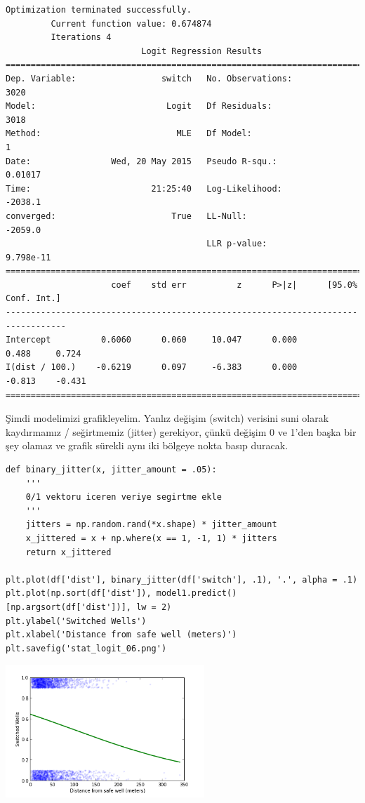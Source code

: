 \documentclass[12pt,fleqn]{article}\usepackage{../../common}
\begin{document}
\begin{verbatim}
Optimization terminated successfully.
         Current function value: 0.674874
         Iterations 4
                           Logit Regression Results                           
==============================================================================
Dep. Variable:                 switch   No. Observations:                 3020
Model:                          Logit   Df Residuals:                     3018
Method:                           MLE   Df Model:                            1
Date:                Wed, 20 May 2015   Pseudo R-squ.:                 0.01017
Time:                        21:25:40   Log-Likelihood:                -2038.1
converged:                       True   LL-Null:                       -2059.0
                                        LLR p-value:                 9.798e-11
==================================================================================
                     coef    std err          z      P>|z|      [95.0% Conf. Int.]
----------------------------------------------------------------------------------
Intercept          0.6060      0.060     10.047      0.000         0.488     0.724
I(dist / 100.)    -0.6219      0.097     -6.383      0.000        -0.813    -0.431
==================================================================================
\end{verbatim}

Şimdi modelimizi grafikleyelim. Yanlız değişim (switch) verisini suni olarak
kaydırmamız / seğirtmemiz (jitter) gerekiyor, çünkü değişim 0 ve 1'den başka bir
şey olamaz ve grafik sürekli aynı iki bölgeye nokta basıp duracak.

\begin{verbatim}
def binary_jitter(x, jitter_amount = .05):
    '''
    0/1 vektoru iceren veriye segirtme ekle
    '''
    jitters = np.random.rand(*x.shape) * jitter_amount
    x_jittered = x + np.where(x == 1, -1, 1) * jitters
    return x_jittered

plt.plot(df['dist'], binary_jitter(df['switch'], .1), '.', alpha = .1)
plt.plot(np.sort(df['dist']), model1.predict()[np.argsort(df['dist'])], lw = 2)
plt.ylabel('Switched Wells')
plt.xlabel('Distance from safe well (meters)')
plt.savefig('stat_logit_06.png')
\end{verbatim}

\includegraphics[height=5cm]{stat_logit_06.png}
\end{document}
